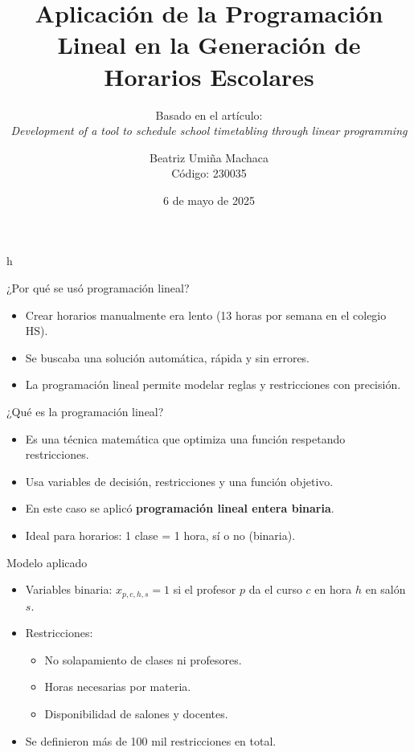 \documentclass{beamer}
\title{Aplicación de la Programación Lineal en la Generación de Horarios Escolares}
\subtitle{Basado en el artículo:\\ \textit{Development of a tool to schedule school timetabling through linear programming}}
\author{Beatriz Umiña Machaca \\ Código: 230035}
\date{6 de mayo de 2025}
\begin{document}
\begin{frame}
  \titlepage
\end{frame}
h
\begin{frame}{¿Por qué se usó programación lineal?}
  \begin{itemize}
    \item Crear horarios manualmente era lento (13 horas por semana en el colegio HS).
    \item Se buscaba una solución automática, rápida y sin errores.
    \item La programación lineal permite modelar reglas y restricciones con precisión.
  \end{itemize}
\end{frame}

\begin{frame}{¿Qué es la programación lineal?}
  \begin{itemize}
    \item Es una técnica matemática que optimiza una función respetando restricciones.
    \item Usa variables de decisión, restricciones y una función objetivo.
    \item En este caso se aplicó \textbf{programación lineal entera binaria}.
    \item Ideal para horarios: 1 clase = 1 hora, sí o no (binaria).
  \end{itemize}
\end{frame}

\begin{frame}{Modelo aplicado}
  \begin{itemize}
    \item Variables binaria: $x_{p,c,h,s} = 1$ si el profesor \( p \) da el curso \( c \) en hora \( h \) en salón \( s \).
    \item Restricciones:
      \begin{itemize}
        \item No solapamiento de clases ni profesores.
        \item Horas necesarias por materia.
        \item Disponibilidad de salones y docentes.
      \end{itemize}
    \item Se definieron más de 100 mil restricciones en total.
  \end{itemize}
\end{frame}
\end{document}
